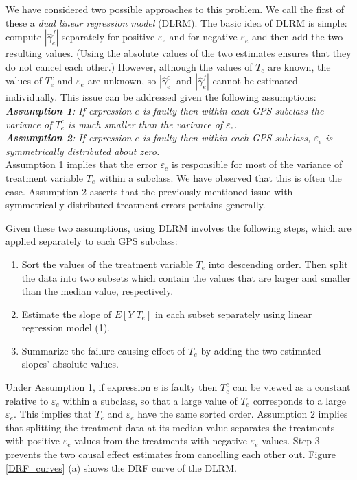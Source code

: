 \documentclass[times]{stvrauth}
\begin{document}
We have considered two possible approaches to this problem.  We call the first of these a {\it dual linear regression model} (DLRM).  The basic idea of DLRM is simple: compute
$|\hat \gamma _e^f|$ separately for positive $\varepsilon_e$ and for negative $\varepsilon_e$ and then add the two resulting values.  (Using the absolute values of the two estimates ensures that they do not cancel each other.)  However, although the values of $T_e$ are known, the values of $ T_e^c$ and $\varepsilon_e$ are unknown, so $|\hat \gamma _e^c|$ and $|\hat \gamma _e^f|$ cannot be estimated individually.  This issue can be addressed given the following assumptions:\\
\newline
\textit{ \textbf{ Assumption 1}: If expression $e$ is faulty then within each GPS subclass the variance of $ T_e^c$ is much smaller than the variance of $\varepsilon_e$.}\\
\textit{ \textbf{ Assumption 2}: If expression $e$ is faulty then within each GPS subclass, $\varepsilon_e$ is symmetrically distributed about zero.}\\
\newline
Assumption 1 implies that the error  $\varepsilon_e$ is responsible for most of the variance of treatment variable $T_e$ within a subclass.  We have observed that this is often the case. Assumption 2 asserts that the previously mentioned issue with symmetrically distributed treatment errors pertains generally.

Given these two assumptions, using DLRM involves the following steps, which are applied separately to each GPS subclass:
\begin{enumerate}
\item Sort the values of the treatment variable $T_e$ into descending order.  Then split the data into two subsets which contain the values that are larger and smaller than the median value, respectively.
\item 	Estimate the slope of $E[Y|T_e]$ in each subset separately using linear regression model (1).
\item 	Summarize the failure-causing effect of $T_e$ by adding the two estimated slopes’ absolute values.
\end{enumerate}
Under Assumption 1, if expression $e$ is faulty then $T_e^c$ can be viewed as a constant relative to $\varepsilon_e$ within a subclass, so that a large value of $T_e$ corresponds to a large $\varepsilon_e$.  This implies that  $T_e$   and $\varepsilon_e$ have the same sorted order. Assumption 2 implies that splitting the treatment data at its median value separates the treatments with positive $\varepsilon_e$ values from the treatments with negative $\varepsilon_e$ values.  Step 3 prevents the two causal effect estimates from cancelling each other out. Figure \ref{DRF_curves} (a) shows the DRF curve of the DLRM.
\end{document}
